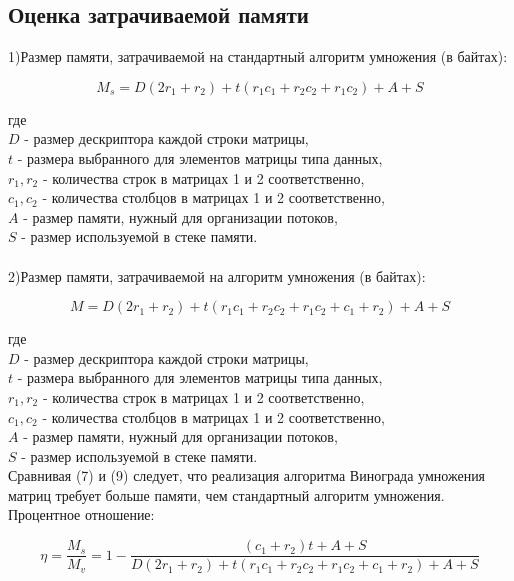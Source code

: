 \documentclass[a4paper,12pt]{article}
\begin{document}
\subsection{Оценка затрачиваемой памяти}
1)Размер памяти, затрачиваемой на стандартный алгоритм умножения (в байтах):
\begin{center}
\begin{equation}
M_s = D(2r_1 + r_2)  + t(r_1c_1 + r_2c_2 + r_1c_2) + A + S
\end{equation}
\end{center}
где \\
$D$ - размер дескриптора каждой строки матрицы,\\
$t$ - размера выбранного для элементов матрицы типа данных,\\
$r_1, r_2$ - количества строк в матрицах 1 и 2 соответственно,\\
$c_1, c_2$ - количества столбцов в матрицах 1 и 2 соответственно,\\
$A$ - размер памяти, нужный для организации потоков,\\
$S$ - размер используемой в стеке памяти.\\
\\
2)Размер памяти, затрачиваемой на алгоритм умножения (в байтах):
\begin{center}
\begin{equation}
M = D(2r_1 + r_2)  + t(r_1c_1 + r_2c_2 + r_1c_2 + c_1 + r_2) + A + S
\end{equation}
\end{center}
где \\
$D$ - размер дескриптора каждой строки матрицы,\\
$t$ - размера выбранного для элементов матрицы типа данных,\\
$r_1, r_2$ - количества строк в матрицах 1 и 2 соответственно,\\
$c_1, c_2$ - количества столбцов в матрицах 1 и 2 соответственно,\\
$A$ - размер памяти, нужный для организации потоков,\\
$S$ - размер используемой в стеке памяти.\\

Сравнивая (7) и (9) следует, что реализация алгоритма Винограда умножения матриц требует больше памяти, чем стандартный алгоритм умножения. \\
Процентное отношение:\\
\begin{center}
\begin{equation}
\eta = \frac{M_s}{M_v} = 1 - \frac{(c_1 + r_2)t + A + S}{D(2r_1 + r_2)  + t(r_1c_1 + r_2c_2 + r_1c_2 + c_1 + r_2) + A + S}
\end{equation}
\end{center}
\end{document}
